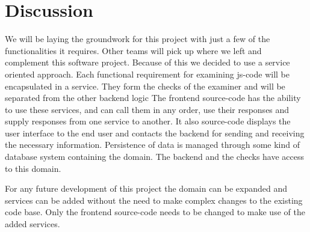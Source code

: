 \section{Discussion}
We will be laying the groundwork for this project
with just a few of the functionalities it requires.
Other teams will pick up where we left and complement this software project.
Because of this we decided to use a service oriented approach.
Each functional requirement for examining \gls{js-code}
will be encapsulated in a service.
They form the \glspl{check} of the \gls{examiner}
and will be separated from the other backend logic
The frontend \gls{source-code} has the ability to use these services,
and can call them in any order, use their responses
and supply responses from one service to another.
It also \gls{source-code} displays the user interface to the end user
and contacts the backend for sending and receiving the necessary information.
Persistence of data is managed through some kind of database system
containing the domain.
The backend and the \glspl{check} have access to this domain.

For any future development of this project
the domain can be expanded
and services can be added
without the need to make complex changes to the existing code base.
Only the frontend \gls{source-code} needs to be changed
to make use of the added services.

